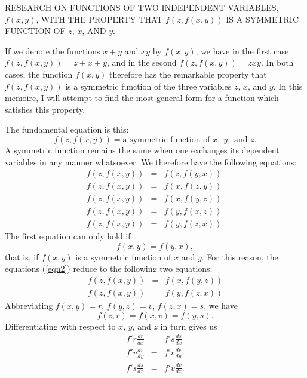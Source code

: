 \documentclass[12pt]{article}
\begin{document}
\begin{center}
RESEARCH ON FUNCTIONS OF TWO INDEPENDENT VARIABLES, $f(x,y)$, WITH THE PROPERTY THAT $f(z,f(x,y))$ IS A SYMMETRIC FUNCTION OF $z$, $x$, AND $y$.
\end{center}

If we denote the functions $x+y$ and $xy$ by $f(x,y)$, we have in the first case $f(z,f(x,y)) = z + x + y$, and in the second $f(z,f(x,y)) = zxy$.  In both cases, the function $f(x,y)$ therefore has the remarkable property that $f(z,f(x,y))$ is a symmetric function of the three variables $z$, $x$, and $y$.  In this memoire, I will attempt to find the most general form for a function which satisfies this property. 

The fundamental equation is this:
\begin{equation} \label{eqn1} f(z,f(x,y)) = \textrm{a symmetric function of } x, \;y, \textrm{ and } z . \end{equation}  
A symmetric function remains the same when one exchanges its dependent variables in any manner whatsoever.  We therefore have the following equations:
\begin{equation} \label{eqn2} \begin{array}{rcl} f(z,f(x,y)) &=& f(z,f(y,x)) \\
  f(z,f(x,y)) &=& f(x,f(z,y)) \\
  f(z,f(x,y)) &=& f(x,f(y,z)) \\
  f(z,f(x,y)) &=& f(y,f(x,z)) \\
  f(z,f(x,y)) &=& f(y,f(z,x)). \end{array} \end{equation}
The first equation can only hold if 
\[ f(x,y) = f(y,x), \]
that is, if $f(x,y)$ is a symmetric function of $x$ and $y$.  For this reason, the equations (\ref{eqn2}) reduce to the following two equations:
\begin{equation} \label{eqn3} \begin{array}{rcl} f(z,f(x,y)) &=& f(x,f(y,z)) \\
 f(z,f(x,y)) &=& f(y,f(z,x)) \end{array} \end{equation}
Abbreviating $f(x,y) = r$, $f(y,z) = v$, $f(z,x) = s$, we have 
\begin{equation} \label{eqn4} f(z,r) = f(x,v) = f(y,s) . \end{equation}
Differentiating with respect to $x$, $y$, and $z$ in turn gives us
\begin{eqnarray*} f'r \frac{dr}{dx} &=& f's \frac{ds}{dx} \\
f'v \frac{dv}{dy} &=& f'r \frac{dr}{dy} \\ 
f's \frac{ds}{dz} &=& f'v \frac{dv}{dz} .\end{eqnarray*}
\end{document}
